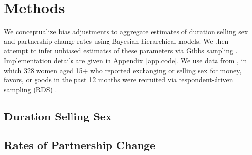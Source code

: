 \section{Methods}\label{meth}
We conceptualize bias adjustments to aggregate estimates of
duration selling sex and partnership change rates
using Bayesian hierarchical models.
We then attempt to infer unbiased estimates of these parameters
via Gibbs sampling \cite{Geman1984}.
Implementation details are given in Appendix~\ref{app.code}.
We use data from \cite{Baral2014}, in which 328 women aged 15+
who reported exchanging or selling sex for money, favors, or goods in the past 12 months
were recruited via respondent-driven sampling (RDS) \cite{Heckathorn1997}.

\subsection{Duration Selling Sex}\label{meth.yss}


\subsection{Rates of Partnership Change}\label{meth.parts}

